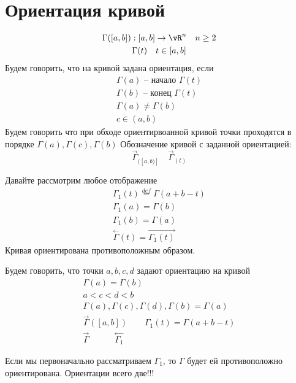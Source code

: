 \documentclass[main]{subfiles}
\begin{document}
\section{Ориентация кривой}
\begin{definition}
    \begin{gather*}
        \Gamma([a,b]): [a,b] \rightarrow {\vR^n}  \quad n \geq 2\\
        \Gamma(t) \quad t \in [a,b]
    \end{gather*}
    Будем говорить, что на кривой задана ориентация, если
    \begin{gather*}
        \Gamma(a) \text { -- начало } \Gamma(t) \\
        \Gamma(b) \text { -- конец } \Gamma(t) \\
        \Gamma(a) \ne \Gamma(b) \\
        c \in (a,b)
    \end{gather*}
    Будем говорить что при обходе ориентирвоанной кривой точки проходятся в порядке $ \Gamma(a), \Gamma(c), \Gamma(b) $
    Обозначение кривой с заданной ориентацией:
    \[ \stackrel{\rightarrow}{\Gamma}_{([a,b)]} \quad \stackrel{\rightarrow}{\Gamma}_{(t)} \]
\end{definition}
\begin{definition}
    Давайте рассмотрим любое отображение
    \begin{gather*}
        \Gamma_1(t) \stackrel{def}{=} \Gamma(a+b-t) \\
        \Gamma_1(a) = \Gamma(b) \\
        \Gamma_1(b) = \Gamma(a) \\
        \stackrel{\leftarrow}{\Gamma} (t) = \stackrel{\rightarrow}{\Gamma_1(t)}
    \end{gather*}
    Кривая ориентирована противоположным образом.
\end{definition}

\begin{definition}
    Будем говорить, что точки $a,b,c,d$ задают ориентацию на кривой
    \begin{gather*}
        \Gamma(a) = \Gamma(b) \\
        a < c < d < b \\
        \Gamma(a), \Gamma(c), \Gamma(d), \Gamma(b) = \Gamma(a)\\
        \stackrel{\rightarrow}{\Gamma}([a,b]) \quad \quad \Gamma_1(t) = \Gamma(a+b-t)\\
        \stackrel{\rightarrow}{\Gamma} \quad \quad \quad \stackrel{\leftarrow}{\Gamma_1}
    \end{gather*}
\end{definition}
Если мы первоначально рассматриваем $\Gamma_1$, то $\Gamma$ будет ей противоположно ориентирована.
Ориентации всего две!!!
\end{document}
